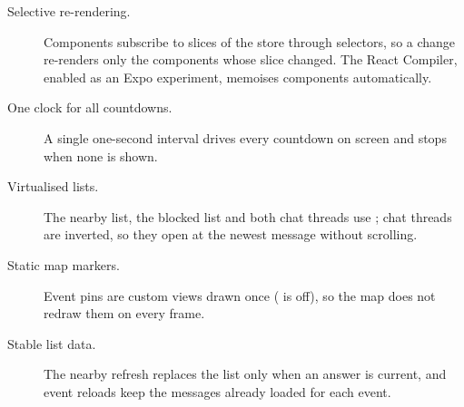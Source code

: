 \begin{description}
  \item[Selective re-rendering.] Components subscribe to slices of the store through selectors, so a
    change re-renders only the components whose slice changed. The React Compiler, enabled as an Expo
    experiment, memoises components automatically.
  \item[One clock for all countdowns.] A single one-second interval drives every countdown on screen and
    stops when none is shown.
  \item[Virtualised lists.] The nearby list, the blocked list and both chat threads use ;
    chat threads are inverted, so they open at the newest message without scrolling.
  \item[Static map markers.] Event pins are custom views drawn once ( is off), so
    the map does not redraw them on every frame.
  \item[Stable list data.] The nearby refresh replaces the list only when an answer is current, and event
    reloads keep the messages already loaded for each event.
\end{description}
